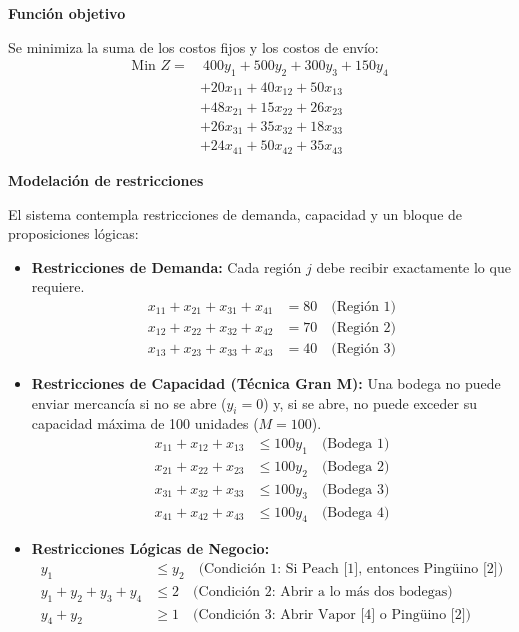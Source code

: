 \documentclass[10pt,a4paper]{article}
\begin{document}
\vspace{3mm}

\textbf{Función objetivo}

Se minimiza la suma de los costos fijos y los costos de envío:
\begin{align*}
\text{Min } Z = & \ 400y_1 + 500y_2 + 300y_3 + 150y_4 \\
                & + 20x_{11} + 40x_{12} + 50x_{13} \\
                & + 48x_{21} + 15x_{22} + 26x_{23} \\
                & + 26x_{31} + 35x_{32} + 18x_{33} \\
                & + 24x_{41} + 50x_{42} + 35x_{43}
\end{align*}

\vspace{3mm}
\textbf{Modelación de restricciones}

El sistema contempla restricciones de demanda, capacidad y un bloque de proposiciones lógicas:

\begin{itemize}
    \item \textbf{Restricciones de Demanda:} Cada región $j$ debe recibir exactamente lo que requiere.
    \begin{align*}
        x_{11} + x_{21} + x_{31} + x_{41} &= 80 \quad \text{(Región 1)} \\
        x_{12} + x_{22} + x_{32} + x_{42} &= 70 \quad \text{(Región 2)} \\
        x_{13} + x_{23} + x_{33} + x_{43} &= 40 \quad \text{(Región 3)}
    \end{align*}

    \item \textbf{Restricciones de Capacidad (Técnica Gran M):} Una bodega no puede enviar mercancía si no se abre ($y_i = 0$) y, si se abre, no puede exceder su capacidad máxima de 100 unidades ($M = 100$).
    \begin{align*}
        x_{11} + x_{12} + x_{13} &\le 100y_1 \quad \text{(Bodega 1)} \\
        x_{21} + x_{22} + x_{23} &\le 100y_2 \quad \text{(Bodega 2)} \\
        x_{31} + x_{32} + x_{33} &\le 100y_3 \quad \text{(Bodega 3)} \\
        x_{41} + x_{42} + x_{43} &\le 100y_4 \quad \text{(Bodega 4)}
    \end{align*}

    \item \textbf{Restricciones Lógicas de Negocio:}
    \begin{align*}
        y_1 &\le y_2 \quad \text{(Condición 1: Si Peach [1], entonces Pingüino [2])} \\
        y_1 + y_2 + y_3 + y_4 &\le 2 \quad \text{(Condición 2: Abrir a lo más dos bodegas)} \\
        y_4 + y_2 &\ge 1 \quad \text{(Condición 3: Abrir Vapor [4] o Pingüino [2])}
    \end{align*}
\end{itemize}
\end{document}
